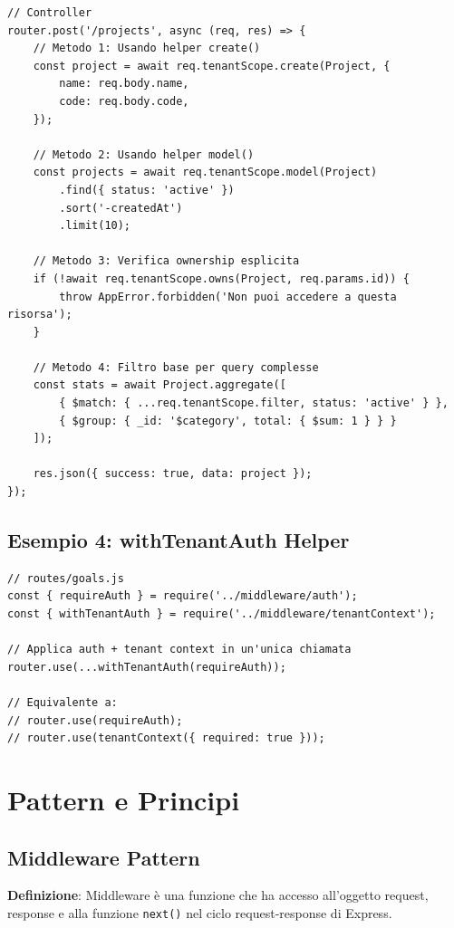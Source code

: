 \documentclass[11pt,a4paper]{article}
\begin{document}
\begin{lstlisting}
// Controller
router.post('/projects', async (req, res) => {
    // Metodo 1: Usando helper create()
    const project = await req.tenantScope.create(Project, {
        name: req.body.name,
        code: req.body.code,
    });
    
    // Metodo 2: Usando helper model()
    const projects = await req.tenantScope.model(Project)
        .find({ status: 'active' })
        .sort('-createdAt')
        .limit(10);
    
    // Metodo 3: Verifica ownership esplicita
    if (!await req.tenantScope.owns(Project, req.params.id)) {
        throw AppError.forbidden('Non puoi accedere a questa risorsa');
    }
    
    // Metodo 4: Filtro base per query complesse
    const stats = await Project.aggregate([
        { $match: { ...req.tenantScope.filter, status: 'active' } },
        { $group: { _id: '$category', total: { $sum: 1 } } }
    ]);
    
    res.json({ success: true, data: project });
});
\end{lstlisting}

\subsection{Esempio 4: withTenantAuth Helper}

\begin{lstlisting}
// routes/goals.js
const { requireAuth } = require('../middleware/auth');
const { withTenantAuth } = require('../middleware/tenantContext');

// Applica auth + tenant context in un'unica chiamata
router.use(...withTenantAuth(requireAuth));

// Equivalente a:
// router.use(requireAuth);
// router.use(tenantContext({ required: true }));
\end{lstlisting}

\section{Pattern e Principi}

\subsection{Middleware Pattern}

\textbf{Definizione}: Middleware è una funzione che ha accesso all'oggetto request, response e alla funzione \texttt{next()} nel ciclo request-response di Express.
\end{document}
